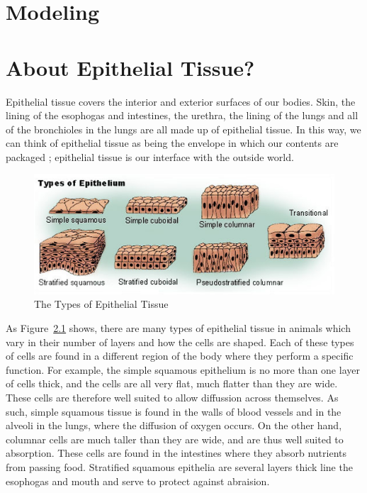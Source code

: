 \chapter{Modeling}
\chapter{About Epithelial Tissue?}
Epithelial tissue covers the interior and exterior surfaces of our bodies. Skin, the lining of the esophogas and intestines, the urethra, the lining of the lungs and all of the bronchioles in the lungs are all made up of epithelial tissue. In this way, we can think of epithelial tissue as being the envelope in which our contents are packaged \cite{Shape Formation}; epithelial tissue is our interface with the outside world. 

\begin{figure}[hb]
\centering \includegraphics[width=\textwidth]{../diagrams/output.png}
\caption{The Types of Epithelial Tissue}
\label{fig:types}
\end{figure}

As Figure~\ref{fig:types} shows, there are many types of epithelial tissue in animals which vary in their number of layers and how the cells are shaped. Each of these types of cells are found in a different region of the body where they perform a specific function.  For example, the simple squamous epithelium is no more than one layer of cells thick, and the cells are all very flat, much flatter than they are wide. These cells are therefore well suited to  allow diffussion across themselves. As such, simple squamous tissue is found in the walls of blood vessels and in the alveoli in the lungs, where the diffusion of oxygen occurs. On the other hand, columnar cells are much taller than they are wide, and are thus well suited to absorption. These cells are found in the intestines where they absorb nutrients from passing food. Stratified squamous epithelia are several layers thick line the esophogas and mouth and serve to protect against abraision.

